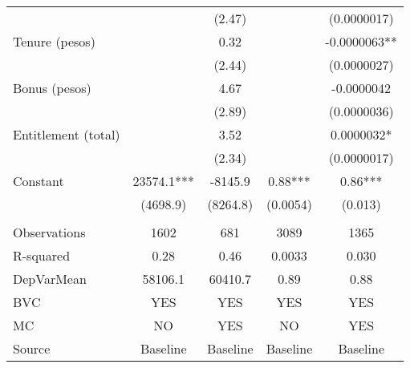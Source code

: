 \begin{tabular}{lcccc}
      &       & (2.47) &       & (0.0000017) \\
Tenure (pesos) &       & 0.32  &       & -0.0000063** \\
      &       & (2.44) &       & (0.0000027) \\
Bonus (pesos) &       & 4.67  &       & -0.0000042 \\
      &       & (2.89) &       & (0.0000036) \\
Entitlement (total) &       & 3.52  &       & 0.0000032* \\
      &       & (2.34) &       & (0.0000017) \\
Constant & 23574.1*** & -8145.9 & 0.88*** & 0.86*** \\
      & (4698.9) & (8264.8) & (0.0054) & (0.013) \\
      &       &       &       &  \\
\midrule
Observations & 1602  & 681   & 3089  & 1365 \\
R-squared & 0.28  & 0.46  & 0.0033 & 0.030 \\
DepVarMean & 58106.1 & 60410.7 & 0.89  & 0.88 \\
BVC   & YES   & YES   & YES   & YES \\
MC    & NO    & YES   & NO    & YES \\
Source & Baseline & Baseline & Baseline & Baseline \\
\bottomrule
\bottomrule
\end{tabular}%
